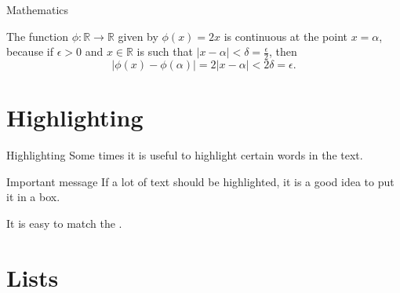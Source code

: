 \documentclass[UKenglish]{beamer}
\begin{document}
\begin{frame}{Mathematics}
    \begin{example}
        The function \(\phi \colon \mathbb{R} \to \mathbb{R}\) given by \(\phi(x) = 2x\) is continuous at the point \(x = \alpha\),
        because if \(\epsilon > 0\) and \(x \in \mathbb{R}\) is such that \(\lvert x - \alpha \rvert < \delta = \frac{\epsilon}{2}\),
        then
        \begin{equation*}
            \lvert \phi(x) - \phi(\alpha)\rvert = 2\lvert x - \alpha \rvert < 2\delta = \epsilon.
        \end{equation*}
    \end{example}
\end{frame}





\section{Highlighting}
\SectionPage


\begin{frame}{Highlighting}
    Some times it is useful to \alert{highlight} certain words in the text.
    
    \begin{alertblock}{Important message}
        If a lot of text should be \alert{highlighted}, it is a good idea to put it in a box.
    \end{alertblock}
    
    It is easy to match the .
\end{frame}


\section{Lists}
\end{document}
